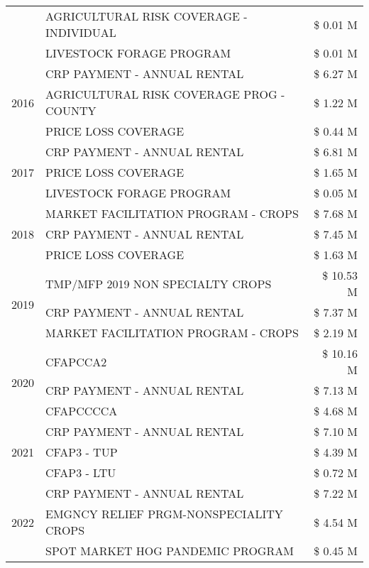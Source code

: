 \begin{tabular}{llr}
 & AGRICULTURAL RISK COVERAGE - INDIVIDUAL & \$ 0.01 M \\
 & LIVESTOCK FORAGE PROGRAM & \$ 0.01 M \\
\cline{1-3}
\multirow[t]{3}{*}{2016} & CRP PAYMENT - ANNUAL RENTAL & \$ 6.27 M \\
 & AGRICULTURAL RISK COVERAGE PROG - COUNTY & \$ 1.22 M \\
 & PRICE LOSS COVERAGE & \$ 0.44 M \\
\cline{1-3}
\multirow[t]{3}{*}{2017} & CRP PAYMENT - ANNUAL RENTAL & \$ 6.81 M \\
 & PRICE LOSS COVERAGE & \$ 1.65 M \\
 & LIVESTOCK FORAGE PROGRAM & \$ 0.05 M \\
\cline{1-3}
\multirow[t]{3}{*}{2018} & MARKET FACILITATION PROGRAM - CROPS & \$ 7.68 M \\
 & CRP PAYMENT - ANNUAL RENTAL & \$ 7.45 M \\
 & PRICE LOSS COVERAGE & \$ 1.63 M \\
\cline{1-3}
\multirow[t]{3}{*}{2019} & TMP/MFP 2019 NON SPECIALTY CROPS & \$ 10.53 M \\
 & CRP PAYMENT - ANNUAL RENTAL & \$ 7.37 M \\
 & MARKET FACILITATION PROGRAM - CROPS & \$ 2.19 M \\
\cline{1-3}
\multirow[t]{3}{*}{2020} & CFAPCCA2 & \$ 10.16 M \\
 & CRP PAYMENT - ANNUAL RENTAL & \$ 7.13 M \\
 & CFAPCCCCA & \$ 4.68 M \\
\cline{1-3}
\multirow[t]{3}{*}{2021} & CRP PAYMENT - ANNUAL RENTAL & \$ 7.10 M \\
 & CFAP3 - TUP & \$ 4.39 M \\
 & CFAP3 - LTU & \$ 0.72 M \\
\cline{1-3}
\multirow[t]{3}{*}{2022} & CRP PAYMENT - ANNUAL RENTAL & \$ 7.22 M \\
 & EMGNCY RELIEF PRGM-NONSPECIALITY CROPS & \$ 4.54 M \\
 & SPOT MARKET HOG PANDEMIC PROGRAM & \$ 0.45 M \\
\cline{1-3}
\bottomrule
\end{tabular}
